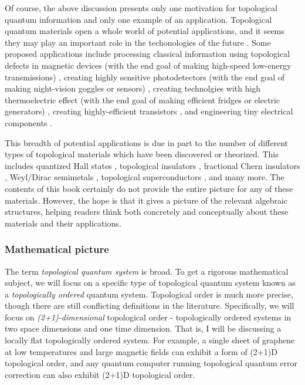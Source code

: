 Of course, the above discussion presents only one motivation for topological quantum information and only one example of an application. Topological quantum materials open a whole world of potential applications, and it seems they may play an important role in the techonologies of the future \cite{ramirez2020dawn}. Some proposed applications include processing classical information using topological defects in magnetic devices (with the end goal of making high-speed low-energy transmissions) \cite{marrows2021perspective, vsmejkal2018topological}, creating highly sensitive photodetectors (with the end goal of making night-vision goggles or sensors) \cite{chan2017photocurrents}, creating technolgies with high thermoelectric effect (with the end goal of making efficient fridges or electric generators) \cite{skinner2018large}, creating highly-efficient transistors \cite{fuhrer2021proposal}, and engineering tiny electrical components \cite{viola2014hall, placke2017model}. 

This breadth of potential applications is due in part to the number of different types of topological materials which have been discovered or theorized. This includes quantized Hall states \cite{von202040}, topological insulators \cite{hasan2010colloquium}, fractional Chern insulators \cite{regnault2011fractional}, Weyl/Dirac semimetals \cite{armitage2018weyl}, topological superconductors \cite{sato2017topological}, and many more. The contents of this book certainly do not provide the entire picture for any of these materials. However, the hope is that it gives a picture of the relevant algebraic structures, helping readers think both concretely and conceptually about these materials and their applications.

\subsubsection{Mathematical picture}

The term {\em topological quantum system} is broad. To get a rigorous mathematical subject, we will focus on a specific type of topological quantum system known as a {\em topologically ordered} quantum system. Topological order is much more precise, though there are still conflicting definitions in the literature. Specifically, we will focus on {\em (2+1)-dimensional} topological order - topologically ordered systems in two space dimensions and one time dimension. That is, I will be discussing a locally flat topologically ordered system. For example, a single sheet of graphene at low temperatures and large magnetic fields can exhibit a form of (2+1)D topological order, and any quantum computer running topological quantum error correction can also exhibit (2+1)D topological order.

